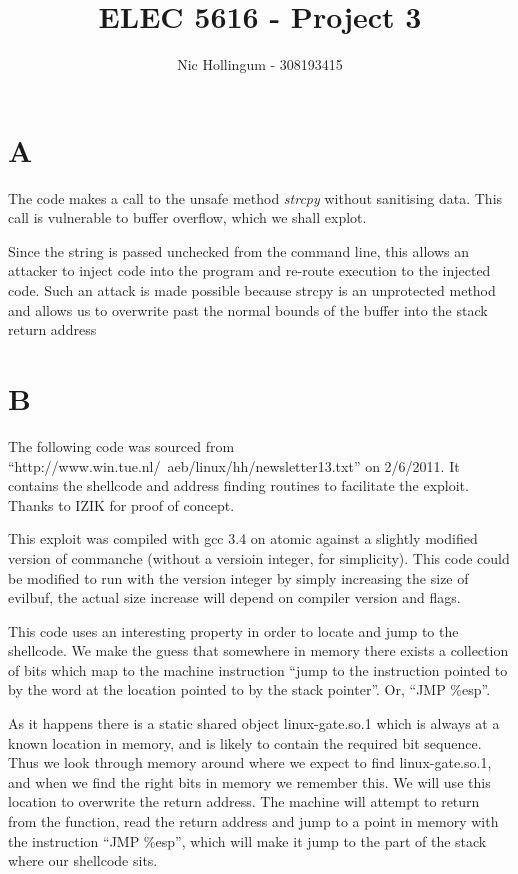 \documentclass{article}
\author{Nic Hollingum - 308193415}
\title{ELEC 5616 - Project 3}
\begin{document}
\maketitle

\section*{A}
The code makes a call to the unsafe method {\em strcpy} without sanitising data.
This call is vulnerable to buffer overflow, which we shall explot.

Since the string is passed unchecked from the command line, this allows an attacker to inject code into the program and re-route execution to the injected code.
Such an attack is made possible because strcpy is an unprotected method and allows us to overwrite past the normal bounds of the buffer into the stack return address

\section*{B}

The following code was sourced from ``http://www.win.tue.nl/~aeb/linux/hh/newsletter13.txt'' on 2/6/2011.
It contains the shellcode and address finding routines to facilitate the exploit.
Thanks to IZIK for proof of concept.

This exploit was compiled with gcc 3.4 on atomic against a slightly modified version of commanche (without a versioin integer, for simplicity).
This code could be modified to run with the version integer by simply increasing the size of evilbuf, the actual size increase will depend on compiler version and flags.

This code uses an interesting property in order to locate and jump to the shellcode.
We make the guess that somewhere in memory there exists a collection of bits which map to the machine instruction ``jump to the instruction pointed to by the word at the location pointed to by the stack pointer''.
Or, ``JMP \%esp''.

As it happens there is a static shared object linux-gate.so.1 which is always at a known location in memory, and is likely to contain the required bit sequence.
Thus we look through memory around where we expect to find linux-gate.so.1, and when we find the right bits in memory we remember this.
We will use this location to overwrite the return address.
The machine will attempt to return from the function, read the return address and jump to a point in memory with the instruction ``JMP \%esp'', which will make it jump to the part of the stack where our shellcode sits.
\end{document}
